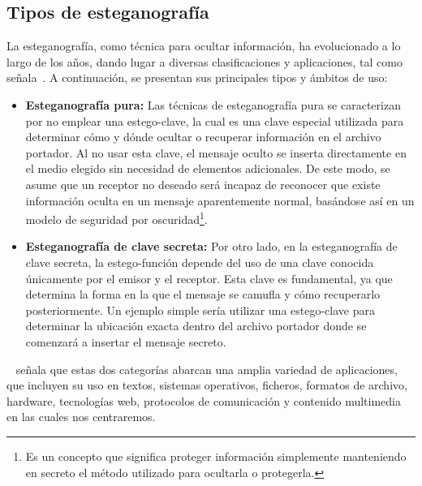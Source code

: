 \subsection{Tipos de esteganografía}

La esteganografía, como técnica para ocultar información, ha evolucionado a lo largo de los años, dando lugar a diversas clasificaciones y aplicaciones, tal como señala~\cite{PabloyIglesias}. A continuación, se presentan sus principales tipos y ámbitos de uso:

\begin{itemize}
  \item \textbf{Esteganografía pura:} Las técnicas de esteganografía pura se caracterizan por no emplear una estego-clave, la cual es una clave especial utilizada para determinar cómo y dónde ocultar o recuperar información en el archivo portador. Al no usar esta clave, el mensaje oculto se inserta directamente en el medio elegido sin necesidad de elementos adicionales. De este modo, se asume que un receptor no deseado será incapaz de reconocer que existe información oculta en un mensaje aparentemente normal, basándose así en un modelo de seguridad por oscuridad\footnote{Es un concepto que significa proteger información simplemente manteniendo en secreto el método utilizado para ocultarla o protegerla. }.
  
  \item \textbf{Esteganografía de clave secreta:} Por otro lado, en la esteganografía de clave secreta, la estego-función depende del uso de una clave conocida únicamente por el emisor y el receptor. Esta clave es fundamental, ya que determina la forma en la que el mensaje se camufla y cómo recuperarlo posteriormente. Un ejemplo simple sería utilizar una estego-clave para determinar la ubicación exacta dentro del archivo portador donde se comenzará a insertar el mensaje secreto.
\end{itemize}

~\cite{PabloyIglesias} señala que estas dos categorías abarcan una amplia variedad de aplicaciones, que incluyen su uso en textos, sistemas operativos, ficheros, formatos de archivo, hardware, tecnologías web, protocolos de comunicación y contenido multimedia en las cuales nos centraremos.\\

